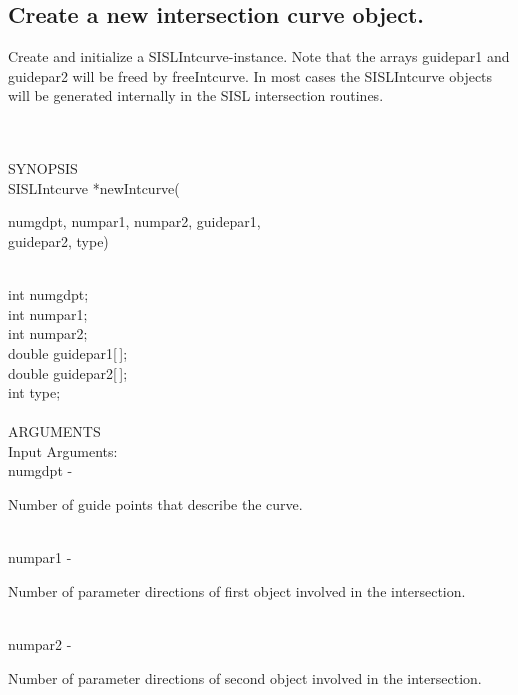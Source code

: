 \subsection{Create a new intersection curve object.}
\begin{minipg1}
Create and initialize a SISLIntcurve-instance. Note that the arrays
{\fov guidepar1} and {\fov guidepar2} will be freed by freeIntcurve. In most cases the SISLIntcurve objects will be generated internally in the SISL intersection routines.
\end{minipg1} \\ \\
SYNOPSIS\\
        \>SISLIntcurve *newIntcurve(\begin{minipg3}
        {\fov numgdpt}, {\fov numpar1}, {\fov numpar2}, {\fov guidepar1},\\ {\fov guidepar2}, type)
                \end{minipg3}\\[0.3ex]
                \>\>    int    \>       {\fov numgdpt};\\
                \>\>    int    \>       {\fov numpar1};\\
                \>\>    int    \>       {\fov numpar2};\\
                \>\>    double \>       {\fov guidepar1}[\,];\\
                \>\>    double \>       {\fov guidepar2}[\,];\\
                \>\>    int    \>       {\fov type};\\
\\
ARGUMENTS\\
        \>Input Arguments:\\
        \>\>    {\fov numgdpt}  \> - \> \begin{minipg2}
                                Number of guide points that describe the curve.
                                \end{minipg2}\\
        \>\>    {\fov numpar1} \> - \> \begin{minipg2}
                                Number of parameter directions of first object
                                involved in the intersection.
                                \end{minipg2}\\[0.8ex]
        \>\>    {\fov numpar2}  \> - \> \begin{minipg2}
                                Number of parameter directions of second object
                                involved in the intersection.
                                \end{minipg2}\\[0.8ex]

